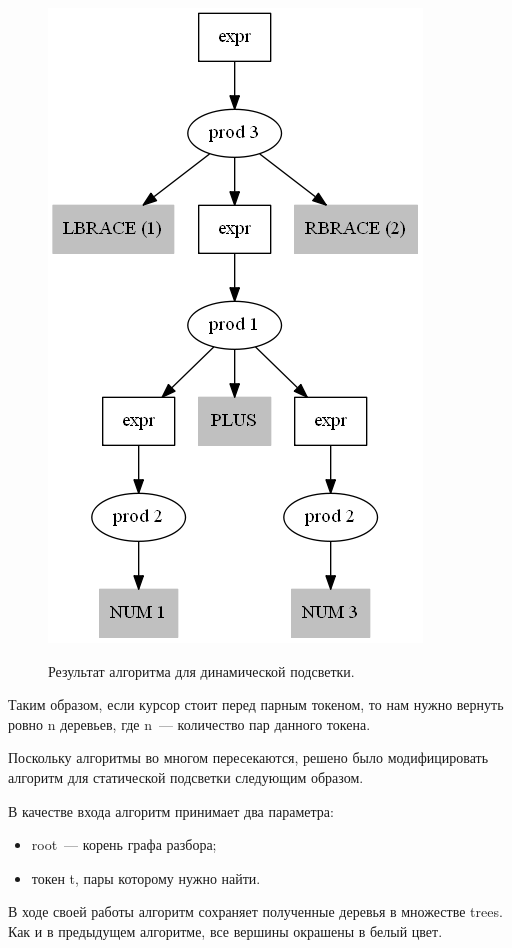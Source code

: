 \begin{figure}[t]
{        \includegraphics{Ivanov/Pictures/Dynamic_DynamicRes2.png}
    }
    \caption{Результат алгоритма для динамической подсветки.}
    \label{dynamicRes}
\end{figure}

Таким образом, если курсор стоит перед парным токеном, то нам нужно вернуть ровно n деревьев, где n~--- количество пар данного токена. 

Поскольку алгоритмы во многом пересекаются, решено было модифицировать алгоритм для статической подсветки следующим образом. 

В качестве входа алгоритм принимает два параметра:
\begin{itemize}
\item root~--- корень графа разбора;
\item токен t, пары которому нужно найти.
\end{itemize}

В ходе своей работы алгоритм сохраняет полученные деревья в множестве trees. Как и в предыдущем алгоритме, все вершины окрашены в белый цвет.

